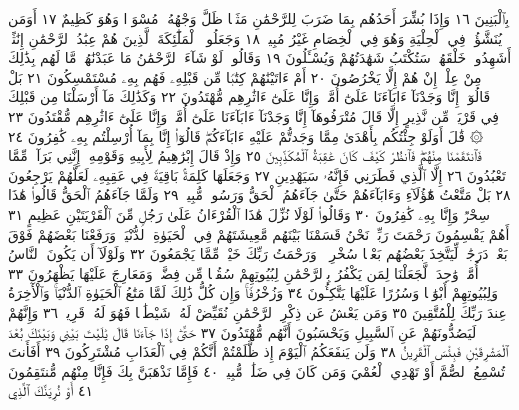 بِٱلْبَنِينَ ١٦ وَإِذَا بُشِّرَ أَحَدُهُم بِمَا ضَرَبَ لِلرَّحْمَٰنِ مَثَلࣰا
ظَلَّ وَجْهُهُۥ مُسْوَدࣰّا وَهُوَ كَظِيمٌ ١٧ أَوَمَن يُنَشَّؤُا۟ فِي
ٱلْحِلْيَةِ وَهُوَ فِي ٱلْخِصَامِ غَيْرُ مُبِينࣲ ١٨ وَجَعَلُوا۟ ٱلْمَلَٰٓئِكَةَ
ٱلَّذِينَ هُمْ عِبَٰدُ ٱلرَّحْمَٰنِ إِنَٰثًاۚ أَشَهِدُوا۟ خَلْقَهُمْۚ سَتُكْتَبُ
شَهَٰدَتُهُمْ وَيُسْـَٔلُونَ ١٩ وَقَالُوا۟ لَوْ شَآءَ ٱلرَّحْمَٰنُ مَا عَبَدْنَٰهُمۗ
مَّا لَهُم بِذَٰلِكَ مِنْ عِلْمٍۖ إِنْ هُمْ إِلَّا يَخْرُصُونَ ٢٠ أَمْ ءَاتَيْنَٰهُمْ
كِتَٰبࣰا مِّن قَبْلِهِۦ فَهُم بِهِۦ مُسْتَمْسِكُونَ ٢١ بَلْ قَالُوٓا۟ إِنَّا
وَجَدْنَآ ءَابَآءَنَا عَلَىٰٓ أُمَّةࣲ وَإِنَّا عَلَىٰٓ ءَاثَٰرِهِم مُّهْتَدُونَ ٢٢
وَكَذَٰلِكَ مَآ أَرْسَلْنَا مِن قَبْلِكَ فِي قَرْيَةࣲ مِّن نَّذِيرٍ إِلَّا قَالَ مُتْرَفُوهَآ
إِنَّا وَجَدْنَآ ءَابَآءَنَا عَلَىٰٓ أُمَّةࣲ وَإِنَّا عَلَىٰٓ ءَاثَٰرِهِم مُّقْتَدُونَ ٢٣
۞ قَٰلَ أَوَلَوْ جِئْتُكُم بِأَهْدَىٰ مِمَّا وَجَدتُّمْ عَلَيْهِ ءَابَآءَكُمْۖ قَالُوٓا۟
إِنَّا بِمَآ أُرْسِلْتُم بِهِۦ كَٰفِرُونَ ٢٤ فَٱنتَقَمْنَا مِنْهُمْۖ فَٱنظُرْ كَيْفَ
كَانَ عَٰقِبَةُ ٱلْمُكَذِّبِينَ ٢٥ وَإِذْ قَالَ إِبْرَٰهِيمُ لِأَبِيهِ وَقَوْمِهِۦٓ إِنَّنِي
بَرَآءࣱ مِّمَّا تَعْبُدُونَ ٢٦ إِلَّا ٱلَّذِي فَطَرَنِي فَإِنَّهُۥ سَيَهْدِينِ ٢٧
وَجَعَلَهَا كَلِمَةَۢ بَاقِيَةࣰ فِي عَقِبِهِۦ لَعَلَّهُمْ يَرْجِعُونَ ٢٨ بَلْ
مَتَّعْتُ هَٰٓؤُلَآءِ وَءَابَآءَهُمْ حَتَّىٰ جَآءَهُمُ ٱلْحَقُّ وَرَسُولࣱ مُّبِينࣱ ٢٩
وَلَمَّا جَآءَهُمُ ٱلْحَقُّ قَالُوا۟ هَٰذَا سِحْرࣱ وَإِنَّا بِهِۦ كَٰفِرُونَ ٣٠ وَقَالُوا۟
لَوْلَا نُزِّلَ هَٰذَا ٱلْقُرْءَانُ عَلَىٰ رَجُلࣲ مِّنَ ٱلْقَرْيَتَيْنِ عَظِيمٍ ٣١ أَهُمْ
يَقْسِمُونَ رَحْمَتَ رَبِّكَۚ نَحْنُ قَسَمْنَا بَيْنَهُم مَّعِيشَتَهُمْ فِي ٱلْحَيَوٰةِ
ٱلدُّنْيَاۚ وَرَفَعْنَا بَعْضَهُمْ فَوْقَ بَعْضࣲ دَرَجَٰتࣲ لِّيَتَّخِذَ بَعْضُهُم
بَعْضࣰا سُخْرِيࣰّاۗ وَرَحْمَتُ رَبِّكَ خَيْرࣱ مِّمَّا يَجْمَعُونَ ٣٢ وَلَوْلَآ
أَن يَكُونَ ٱلنَّاسُ أُمَّةࣰ وَٰحِدَةࣰ لَّجَعَلْنَا لِمَن يَكْفُرُ بِٱلرَّحْمَٰنِ
لِبُيُوتِهِمْ سُقُفࣰا مِّن فِضَّةࣲ وَمَعَارِجَ عَلَيْهَا يَظْهَرُونَ ٣٣
وَلِبُيُوتِهِمْ أَبْوَٰبࣰا وَسُرُرًا عَلَيْهَا يَتَّكِـُٔونَ ٣٤ وَزُخْرُفࣰاۚ وَإِن
كُلُّ ذَٰلِكَ لَمَّا مَتَٰعُ ٱلْحَيَوٰةِ ٱلدُّنْيَاۚ وَٱلْأٓخِرَةُ عِندَ رَبِّكَ
لِلْمُتَّقِينَ ٣٥ وَمَن يَعْشُ عَن ذِكْرِ ٱلرَّحْمَٰنِ نُقَيِّضْ لَهُۥ شَيْطَٰنࣰا
فَهُوَ لَهُۥ قَرِينࣱ ٣٦ وَإِنَّهُمْ لَيَصُدُّونَهُمْ عَنِ ٱلسَّبِيلِ وَيَحْسَبُونَ
أَنَّهُم مُّهْتَدُونَ ٣٧ حَتَّىٰٓ إِذَا جَآءَنَا قَالَ يَٰلَيْتَ بَيْنِي وَبَيْنَكَ
بُعْدَ ٱلْمَشْرِقَيْنِ فَبِئْسَ ٱلْقَرِينُ ٣٨ وَلَن يَنفَعَكُمُ ٱلْيَوْمَ
إِذ ظَّلَمْتُمْ أَنَّكُمْ فِي ٱلْعَذَابِ مُشْتَرِكُونَ ٣٩ أَفَأَنتَ تُسْمِعُ
ٱلصُّمَّ أَوْ تَهْدِي ٱلْعُمْيَ وَمَن كَانَ فِي ضَلَٰلࣲ مُّبِينࣲ ٤٠ فَإِمَّا
نَذْهَبَنَّ بِكَ فَإِنَّا مِنْهُم مُّنتَقِمُونَ ٤١ أَوْ نُرِيَنَّكَ ٱلَّذِي
